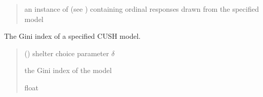 \documentclass[letterpaper,10pt,english]{sphinxmanual}
\begin{document}
\begin{fulllineitems}
\begin{quote}
\begin{description}
\begin{itemize}
\end{itemize}

\sphinxAtStartPar
an instance of  (see ) containing ordinal responses drawn from the specified model

\end{description}\end{quote}

\end{fulllineitems}


\begin{fulllineitems}
\label{\detokenize{cubmods:cubmods.cush.gini}}
\pysigstartsignatures
{}
\pysigstopsignatures
\sphinxAtStartPar
The Gini index of a specified CUSH model.
\begin{quote}\begin{description}
\sphinxAtStartPar
{} () \textendash{} shelter choice parameter \(\delta\)

\sphinxAtStartPar
the Gini index of the model

\sphinxAtStartPar
float

\end{description}\end{quote}

\end{fulllineitems}

\end{document}
